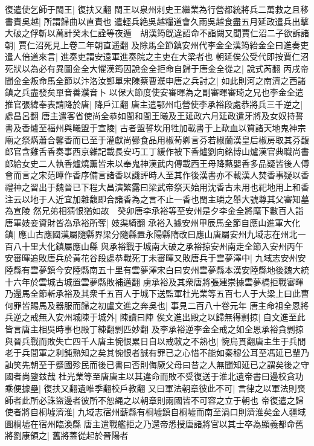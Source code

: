 復遣使乞師于閩王|{
	復扶又翻}
閩王以泉州刺史王繼業為行營都統將兵二萬救之且移書責吳越|{
	所謂歸曲以直責也}
遣輕兵絶吳越糧道會久雨吳越食盡五月延政遣兵出擊大破之俘斬以萬計癸未仁詮等夜遁　胡漢筠旣違詔命不詣闕又聞賈仁沼二子欲訴諸朝|{
	賈仁沼死見上卷二年朝直遥翻}
及除馬全節鎮安州代李金全漢筠紿金全曰進奏吏遣人倍道來言|{
	進奏吏謂安遠軍進奏院之主吏在大梁者也}
朝延俟公受代即按賈仁沼死狀以為必有異圖金全大懼漢筠因說金全拒命自歸于唐金全從之|{
	說式芮翻}
丙戌帝聞金全叛命馬全節以汴洛汝鄭單宋陳蔡曹濮申唐之兵討之|{
	如此則河之南濟之西諸鎮之兵盡發矣單音善濮音卜}
以保大節度使安審暉為之副審暉審琦之兄也李金全遣推官張緯奉表請降於唐|{
	降戶江翻}
唐主遣鄂州屯營使李承裕段處恭將兵三千逆之|{
	處昌呂翻}
唐主遣客省使尚全恭如閩和閩王曦及王延政六月延政遣牙將及女奴持誓書及香爐至福州與曦盟于宣陵|{
	古者盟誓坎用牲加載書于上歃血以質諸天地鬼神宗廟之祭焫蕭合馨香而已至于灌獻尚鬰食品用椒荀卿言芬若椒蘭漢皇后椒房取其芬馥郎官含雞舌香奏事西京雜記載長安巧工丁緩作被下香爐劉向銘博山爐漢官典職尚書郎給女史二人執香爐燒薰皆未以奉鬼神漢武内傳載西王母降爇嬰香多品疑皆後人傅會而言之宋范曄作香序備言諸香以譏評時人至其作後漢書亦不載漢人焚香事疑以香禮神之習出于魏晉已下程大昌演繁露曰梁武帝祭天始用沈香古未用也祀地用上和香注云以地于人近宜加雜馥即合諸香為之言不止一香也閩主璘之舉大號尊其父審知墓為宣陵}
然兄弟相猜恨猶如故　癸卯唐李承裕等至安州是夕李金全將麾下數百人詣唐軍妓妾資財皆為承裕所奪|{
	妓渠綺翻}
承裕入據安州甲辰馬全節自應山進軍大化鎮|{
	應山古應國漢屬隨縣界梁分隨縣置永陽縣隋改曰應山唐屬安州九域志在州北一百八十里大化鎮屬應山縣}
與承裕戰于城南大破之承裕掠安州南走全節入安州丙午安審暉追敗唐兵於黃花谷段處恭戰死丁未審暉又敗唐兵于雲夢澤中|{
	九域志安州安陸縣有雲夢鎮今安陸縣南五十里有雲夢澤宋白曰安州雲夢縣本漢安陸縣地後魏大統十六年於雲城古城置雲夢縣敗補邁翻}
虜承裕及其衆唐將張建崇據雲夢橋拒戰審暉乃還馬全節斬承裕及其衆千五百人于城下送監軍杜光業等五百七人于大梁上曰此曹何罪皆賜馬及器服而歸之初盧文進之奔吳也|{
	事見二百八十卷元年}
唐主命祖全恩將兵逆之戒無入安州城陳于城外|{
	陳讀曰陣}
俟文進出殿之以歸無得剽掠|{
	自文進至此皆言唐主相吳時事也殿丁練翻剽匹妙翻}
及李承裕逆李金全戒之如全恩承裕貪剽掠與晉兵戰而敗失亡四千人唐主惋恨累日自以戒敇之不熟也|{
	惋烏貫翻唐主生于兵間老于兵間軍之利鈍熟知之矣其惋恨者誠有罪已之心惜不能如秦穆公耳至馮延已輩乃訕笑先朝至于蹙國殄民而後已書曰否則侮厥父母曰昔之人無聞知延已之謂矣後之守國者尚鑒兹哉}
杜光業等至唐唐主以其違命而敗不受復送于淮北遺帝書曰邊校貪功乘便據壘|{
	復扶又翻遺唯季翻校戶教翻}
又曰軍法朝章彼此不可|{
	言律之以軍法則喪師者此所必誅盜邊者彼所不恕䋲之以朝章則兩國皆不可容之立于朝也}
帝復遣之歸使者將自桐墟濟淮|{
	九域志宿州蘄縣有桐墟鎮自桐墟而南至渦口則濟淮矣金人疆域圖桐墟在宿州臨渙縣}
唐主遣戰艦拒之乃還帝悉授唐諸將官以其士卒為顯義都命舊將劉康領之|{
	舊將蓋從起於晉陽者}


